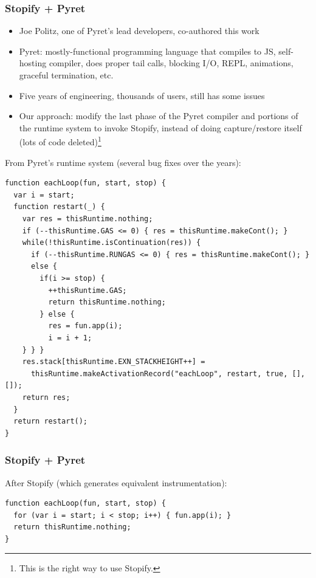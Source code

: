 \documentclass[8pt,pdf,handout]{beamer}
\begin{document}
\begin{frame}[fragile]
\frametitle{Stopify + Pyret}

\begin{itemize}

  \item Joe Politz, one of Pyret's lead developers, co-authored this work

  \item Pyret: mostly-functional programming language that compiles to JS,
  self-hosting compiler, does proper tail calls, blocking I/O, REPL,
  animations, graceful termination, etc.

  \item Five years of engineering, thousands of users, still has some issues

  \pause
  \item Our approach: modify the last phase of the Pyret compiler and portions
  of the runtime system to invoke Stopify, instead of doing capture/restore
  itself (lots of code deleted)\footnote{This is the right way to use Stopify.}

\end{itemize}

\pause

From Pyret's runtime system (several bug fixes over the years):

\begin{lstlisting}[basicstyle={\fontsize{6}{6.2}\ttfamily}]
function eachLoop(fun, start, stop) {
  var i = start;
  function restart(_) {
    var res = thisRuntime.nothing;
    if (--thisRuntime.GAS <= 0) { res = thisRuntime.makeCont(); }
    while(!thisRuntime.isContinuation(res)) {
      if (--thisRuntime.RUNGAS <= 0) { res = thisRuntime.makeCont(); }
      else {
        if(i >= stop) {
          ++thisRuntime.GAS;
          return thisRuntime.nothing;
        } else {
          res = fun.app(i);
          i = i + 1;
    } } }
    res.stack[thisRuntime.EXN_STACKHEIGHT++] =
      thisRuntime.makeActivationRecord("eachLoop", restart, true, [], []);
    return res;
  }
  return restart();
}
\end{lstlisting}
\end{frame}

\begin{frame}[fragile]
\frametitle{Stopify + Pyret}

After Stopify (which generates equivalent instrumentation):

\begin{lstlisting}
function eachLoop(fun, start, stop) {
  for (var i = start; i < stop; i++) { fun.app(i); }
  return thisRuntime.nothing;
}
\end{lstlisting}

\begin{center}
\end{center}

\end{frame}
\end{document}
